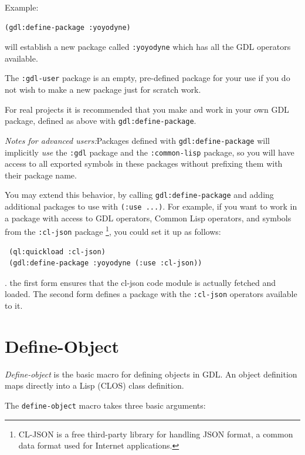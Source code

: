 \documentclass [11pt]{book}
\begin{document}
Example:

\begin{verbatim}(gdl:define-package :yoyodyne)
\end{verbatim} will establish a new package called \texttt{:yoyodyne} which has all the GDL operators available.



The \texttt{:gdl-user} package is an empty, pre-defined package for your use if
you do not wish to make a new package just for scratch work.



For real projects it is recommended that you make and work in your own
GDL package, defined as above with \texttt{gdl:define-package}.



\emph{Notes for advanced users:}Packages defined with \texttt{gdl:define-package} will implicitly \emph{use} the \texttt{:gdl} package and the \texttt{:common-lisp} package, so you will have access to all exported symbols
  in these packages without prefixing them with their package name.

  You may extend this behavior, by calling \texttt{gdl:define-package} and adding additional packages to use with \texttt{(:use ...)}.  For example, if  you want to work in a package with access to GDL operators,
 Common Lisp operators, and symbols from the \texttt{:cl-json} package \footnote{CL-JSON is a free third-party library for handling JSON format, a common data format used 
for Internet applications.}, you could set it up as follows:

\begin{verbatim} (ql:quickload :cl-json)
 (gdl:define-package :yoyodyne (:use :cl-json))
\end{verbatim}. the first form ensures that the cl-json code module is actually  fetched and loaded. The second form
defines a package with the \texttt{:cl-json} operators available to it.



\section{Define-Object}

\label{sec:define-object}

\emph{Define-object} is the basic macro for defining objects in GDL. An object 
definition maps directly into a Lisp (CLOS) class definition. 

The \texttt{define-object} macro takes three basic arguments:
\end{document}
